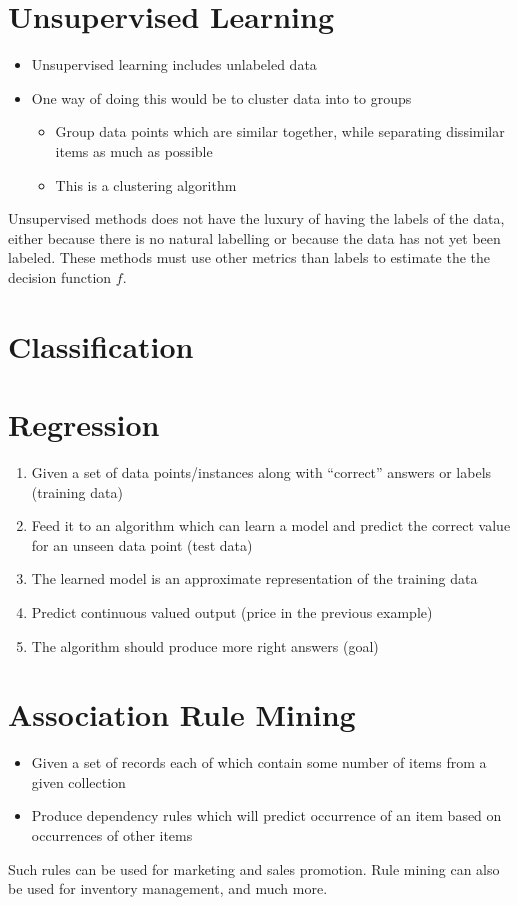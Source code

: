\section{Unsupervised Learning}
\begin{itemize}
    \item Unsupervised learning includes unlabeled data
    \item One way of doing this would be to cluster data into to groups
    \begin{itemize}
        \item Group data points which are similar together, while separating 
        dissimilar items as much as possible
        \item This is a clustering algorithm
    \end{itemize}
\end{itemize}

Unsupervised methods does not have the luxury of having the labels of the data,
either because there is no natural labelling or because the data has not yet
been labeled. These methods must use other metrics than labels to estimate the
the decision function $f$. 

\section{Classification}
\section{Regression}
\begin{enumerate}
    \item Given a set of data points/instances along with “correct” answers or 
    labels (training data)
    \item Feed it to an algorithm which can learn a model and predict the 
    correct value for an unseen data point (test data)
    \item The learned model is an approximate representation of the training 
    data
    \item Predict continuous valued output (price in the previous example)
    \item The algorithm should produce more right answers (goal)
\end{enumerate}


\section{Association Rule Mining}
\begin{itemize}
    \item Given a set of records each of which contain some number of items from a given collection
    \item Produce dependency rules which will predict occurrence of an item based on occurrences of other items
\end{itemize}
Such rules can be used for marketing and sales promotion. Rule mining can also be used for inventory management, and much more.

